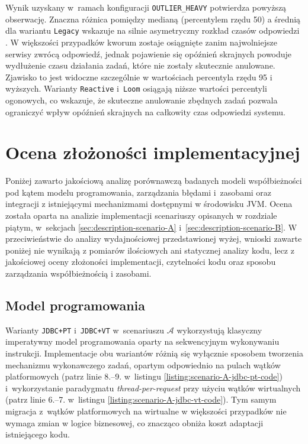 Wynik uzyskany w~ramach konfiguracji \texttt{OUTLIER\_HEAVY} potwierdza powyższą obserwację. Znaczna różnica pomiędzy medianą (percentylem rzędu 50) a średnią dla wariantu \texttt{Legacy} wskazuje na silnie asymetryczny rozkład czasów odpowiedzi \cite{luszniewicz1970}. W większości przypadków kworum zostaje osiągnięte zanim najwolniejsze serwisy zwrócą odpowiedź, jednak pojawienie się opóźnień skrajnych powoduje wydłużenie czasu działania zadań, które nie zostały skutecznie anulowane. Zjawisko to jest widoczne szczególnie w wartościach percentyla rzędu 95 i wyższych. Warianty \texttt{Reactive} i~\texttt{Loom} osiągają niższe wartości percentyli ogonowych, co wskazuje, że skuteczne anulowanie zbędnych zadań pozwala ograniczyć wpływ opóźnień skrajnych na całkowity czas odpowiedzi systemu.

\section{Ocena złożoności implementacyjnej}
\label{sec:implementation-complexity}

Poniżej zawarto jakościową analizę porównawczą badanych modeli współbieżności pod kątem modelu programowania, zarządzania błędami i~zasobami oraz integracji z istniejącymi mechanizmami dostępnymi w środowisku JVM. Ocena została oparta na analizie implementacji scenariuszy opisanych w rozdziale piątym, w~sekcjach \ref{sec:description-scenario-A} i~\ref{sec:description-scenario-B}. W przeciwieństwie do analizy wydajnościowej przedstawionej wyżej, wnioski zawarte poniżej nie wynikają z pomiarów ilościowych ani statycznej analizy kodu, lecz z jakościowej oceny złożoności implementacji, czytelności kodu oraz sposobu zarządzania współbieżnością i zasobami.

\subsection{Model programowania}
\label{sec:quant-analysis-programming-model}

Warianty \texttt{JDBC+PT} i~\texttt{JDBC+VT} w~scenariuszu $\mathcal{A}$ wykorzystują klasyczny imperatywny model programowania oparty na sekwencyjnym wykonywaniu instrukcji. Implementacje obu wariantów różnią się wyłącznie sposobem tworzenia mechanizmu wykonawczego zadań, opartym odpowiednio na pulach wątków platformowych (patrz linie 8.--9. w~listingu \ref{listing:scenario-A-jdbc-pt-code}) i~wykorzystanie paradygmatu \emph{thread-per-request} przy użyciu wątków wirtualnych (patrz linie 6.--7. w~listingu \ref{listing:scenario-A-jdbc-vt-code}). Tym samym migracja z~wątków platformowych na wirtualne w większości przypadków nie wymaga zmian w logice biznesowej, co znacząco obniża koszt adaptacji istniejącego kodu.

